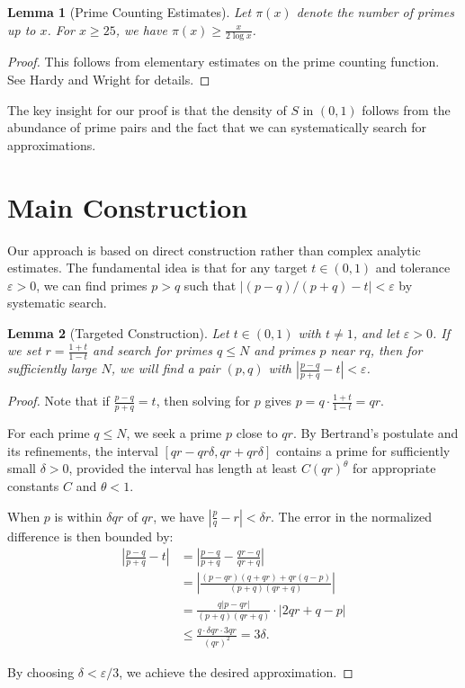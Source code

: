 \documentclass[11pt]{article}
\newtheorem{lemma}{Lemma}
\begin{document}
\begin{lemma}[Prime Counting Estimates]\label{lem:prime_counting}
Let $\pi(x)$ denote the number of primes up to $x$. For $x \geq 25$, we have $\pi(x) \geq \frac{x}{2\log x}$.
\end{lemma}

\begin{proof}
This follows from elementary estimates on the prime counting function. See Hardy and Wright \cite{hardy2008} for details.
\end{proof}

The key insight for our proof is that the density of $S$ in $(0,1)$ follows from the abundance of prime pairs and the fact that we can systematically search for approximations.

\section{Main Construction}

Our approach is based on direct construction rather than complex analytic estimates. The fundamental idea is that for any target $t \in (0,1)$ and tolerance $\varepsilon > 0$, we can find primes $p > q$ such that $|(p-q)/(p+q) - t| < \varepsilon$ by systematic search.

\begin{lemma}[Targeted Construction]\label{lem:targeted}
Let $t \in (0,1)$ with $t \neq 1$, and let $\varepsilon > 0$. If we set $r = \frac{1+t}{1-t}$ and search for primes $q \leq N$ and primes $p$ near $rq$, then for sufficiently large $N$, we will find a pair $(p,q)$ with $\left|\frac{p-q}{p+q} - t\right| < \varepsilon$.
\end{lemma}

\begin{proof}
Note that if $\frac{p-q}{p+q} = t$, then solving for $p$ gives $p = q \cdot \frac{1+t}{1-t} = qr$.

For each prime $q \leq N$, we seek a prime $p$ close to $qr$. By Bertrand's postulate and its refinements, the interval $[qr - qr\delta, qr + qr\delta]$ contains a prime for sufficiently small $\delta > 0$, provided the interval has length at least $C(qr)^{\theta}$ for appropriate constants $C$ and $\theta < 1$.

When $p$ is within $\delta qr$ of $qr$, we have $\left|\frac{p}{q} - r\right| < \delta r$. The error in the normalized difference is then bounded by:
\begin{align}
\left|\frac{p-q}{p+q} - t\right| &= \left|\frac{p-q}{p+q} - \frac{qr-q}{qr+q}\right|\\
&= \left|\frac{(p-qr)(q+qr) + qr(q-p)}{(p+q)(qr+q)}\right|\\
&= \frac{q|p-qr|}{(p+q)(qr+q)} \cdot |2qr + q - p|\\
&\leq \frac{q \cdot \delta qr \cdot 3qr}{(qr)^2} = 3\delta.
\end{align}

By choosing $\delta < \varepsilon/3$, we achieve the desired approximation.
\end{proof}
\end{document}
